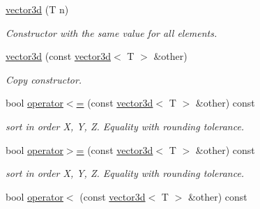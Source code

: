 \begin{DoxyCompactItemize}
\mbox{\label{classirr_1_1core_1_1vector3d_a08093c70044d66a5c3cdec2522b868f2}} 
\hyperlink{classirr_1_1core_1_1vector3d_a08093c70044d66a5c3cdec2522b868f2}{vector3d} (T n)
\begin{DoxyCompactList}\small\item\em Constructor with the same value for all elements. \end{DoxyCompactList}\item 
\mbox{\label{classirr_1_1core_1_1vector3d_a039600f48ce75c9eca6c0899135e60d5}} 
\hyperlink{classirr_1_1core_1_1vector3d_a039600f48ce75c9eca6c0899135e60d5}{vector3d} (const \hyperlink{classirr_1_1core_1_1vector3d}{vector3d}$<$ T $>$ \&other)
\begin{DoxyCompactList}\small\item\em Copy constructor. \end{DoxyCompactList}\item 
\mbox{\label{classirr_1_1core_1_1vector3d_a57c48c162085c20e19be6630551bde0a}} 
bool \hyperlink{classirr_1_1core_1_1vector3d_a57c48c162085c20e19be6630551bde0a}{operator$<$=} (const \hyperlink{classirr_1_1core_1_1vector3d}{vector3d}$<$ T $>$ \&other) const
\begin{DoxyCompactList}\small\item\em sort in order X, Y, Z. Equality with rounding tolerance. \end{DoxyCompactList}\item 
\mbox{\label{classirr_1_1core_1_1vector3d_a875266ef671a17b2e6646aeeaaa362d4}} 
bool \hyperlink{classirr_1_1core_1_1vector3d_a875266ef671a17b2e6646aeeaaa362d4}{operator$>$=} (const \hyperlink{classirr_1_1core_1_1vector3d}{vector3d}$<$ T $>$ \&other) const
\begin{DoxyCompactList}\small\item\em sort in order X, Y, Z. Equality with rounding tolerance. \end{DoxyCompactList}\item 
\mbox{\label{classirr_1_1core_1_1vector3d_a351356db0565148c5d50da21a8509dc8}} 
bool \hyperlink{classirr_1_1core_1_1vector3d_a351356db0565148c5d50da21a8509dc8}{operator$<$} (const \hyperlink{classirr_1_1core_1_1vector3d}{vector3d}$<$ T $>$ \&other) const

\end{DoxyCompactItemize}
